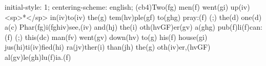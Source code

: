 initial-style: 1;
centering-scheme: english;
(cb4)Two(fg) men(f) went(gi) up(iv) <sp>*</sp> in(iv)to(iv) the(g) tem(hv)ple(gf) to(ghg) pray:(f) (;) the(d) one(d) a(c) Phar(fg)i(fghiv)see,(iv) and(hj) the(i) oth(hvGF)er(gv) a(ghg) pub(f)li(f)can:(f) (;) this(dc) man(fv) went(gv) down(hv) to(g) his(f) house(gi) jus(hi)ti(iv)fied(hi) ra(jv)ther(i) than(jh) the(g) oth(iv)er,(hvGF) al(gv)le(gh)lu(f)ia.(f)
